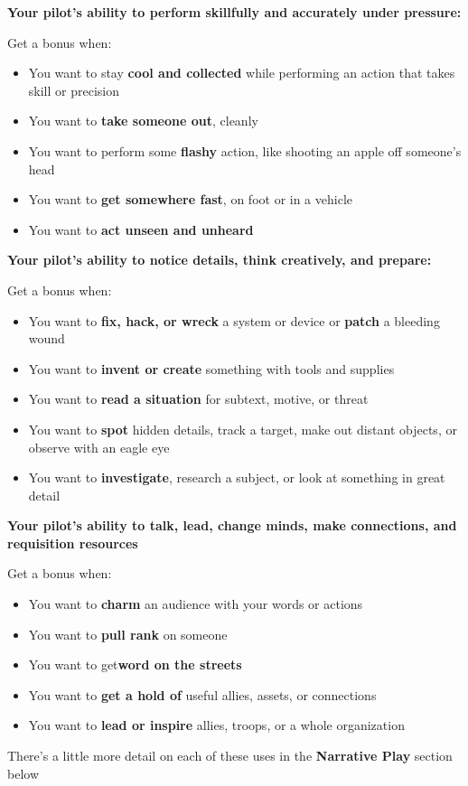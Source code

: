 \textbf{Your pilot's ability to perform skillfully and accurately under pressure:}

Get a bonus when:
\begin{itemize}
\item You want to stay \textbf{cool and collected} while performing an action that takes skill or precision
\item You want to \textbf{take someone out}, cleanly
\item You want to perform some \textbf{flashy} action, like shooting an apple off someone's head
\item You want to \textbf{get somewhere fast}, on foot or in a vehicle
\item You want to \textbf{act unseen and unheard}
\end{itemize}  

\textbf{Your pilot's ability to notice details, think creatively, and prepare:}

Get a bonus when:
\begin{itemize}
\item You want to \textbf{fix, hack, or wreck} a system or device or \textbf{patch} a bleeding wound
\item You want to \textbf{invent or create} something with tools and supplies
\item You want to \textbf{read a situation} for subtext, motive, or threat
\item You want to \textbf{spot} hidden details, track a target, make out distant objects, or observe with an eagle eye
\item You want to \textbf{investigate}, research a subject, or look at something in great detail
\end{itemize}  

\textbf{Your pilot's ability to talk, lead, change minds, make connections, and requisition resources}

Get a bonus when:
\begin{itemize}
\item You want to \textbf{charm} an audience with your words or actions
\item You want to \textbf{pull rank} on someone
\item You want to get\textbf{word on the streets}
\item You want to \textbf{get a hold of} useful allies, assets, or connections
\item You want to \textbf{lead or inspire} allies, troops, or a whole organization
\end{itemize}  

There's a little more detail on each of these uses in the \textbf{Narrative Play} section below